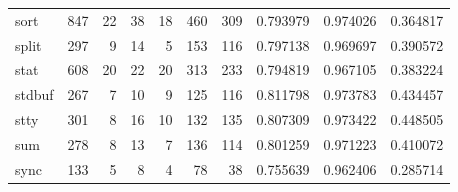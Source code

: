 \begin{tabular}{lrrrrrrrrr}
sort      &                    847 &                                 22 &                                38 &                               18 &                               460 &                             309 &                                0.793979 &                               0.974026 &                             0.364817 \\
split     &                    297 &                                  9 &                                14 &                                5 &                               153 &                             116 &                                0.797138 &                               0.969697 &                             0.390572 \\
stat      &                    608 &                                 20 &                                22 &                               20 &                               313 &                             233 &                                0.794819 &                               0.967105 &                             0.383224 \\
stdbuf    &                    267 &                                  7 &                                10 &                                9 &                               125 &                             116 &                                0.811798 &                               0.973783 &                             0.434457 \\
stty      &                    301 &                                  8 &                                16 &                               10 &                               132 &                             135 &                                0.807309 &                               0.973422 &                             0.448505 \\
sum       &                    278 &                                  8 &                                13 &                                7 &                               136 &                             114 &                                0.801259 &                               0.971223 &                             0.410072 \\
sync      &                    133 &                                  5 &                                 8 &                                4 &                                78 &                              38 &                                0.755639 &                               0.962406 &                             0.285714 \\

\end{tabular}
